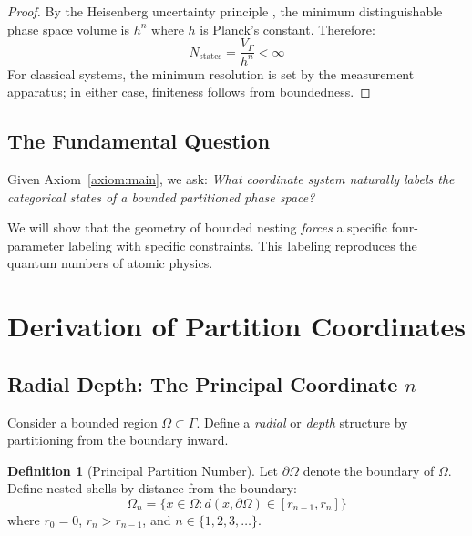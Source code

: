 \documentclass[twocolumn,10pt,a4paper]{article}
\theoremstyle{definition}
\newtheorem{definition}[theorem]{Definition}
\theoremstyle{remark}
\begin{document}
\begin{proof}
By the Heisenberg uncertainty principle \cite{heisenberg1927}, the minimum distinguishable phase space volume is $h^n$ where $h$ is Planck's constant. Therefore:
\begin{equation}
    N_{\text{states}} = \frac{V_\Gamma}{h^n} < \infty
\end{equation}
For classical systems, the minimum resolution is set by the measurement apparatus; in either case, finiteness follows from boundedness.
\end{proof}

\subsection{The Fundamental Question}

Given Axiom~\ref{axiom:main}, we ask: \emph{What coordinate system naturally labels the categorical states of a bounded partitioned phase space?}

We will show that the geometry of bounded nesting \emph{forces} a specific four-parameter labeling with specific constraints. This labeling reproduces the quantum numbers of atomic physics.

\section{Derivation of Partition Coordinates}
\label{sec:coordinates}

\subsection{Radial Depth: The Principal Coordinate $n$}

Consider a bounded region $\Omega \subset \Gamma$. Define a \emph{radial} or \emph{depth} structure by partitioning from the boundary inward.

\begin{definition}[Principal Partition Number]
Let $\partial\Omega$ denote the boundary of $\Omega$. Define nested shells by distance from the boundary:
\begin{equation}
    \Omega_n = \{x \in \Omega : d(x, \partial\Omega) \in [r_{n-1}, r_n]\}
\end{equation}
where $r_0 = 0$, $r_n > r_{n-1}$, and $n \in \{1, 2, 3, \ldots\}$.
\end{definition}
\end{document}

